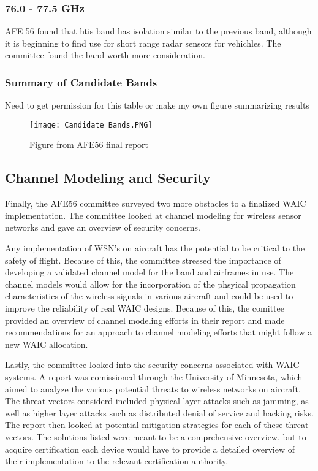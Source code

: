 \subsubsection{76.0 - 77.5 GHz}
 AFE 56 found that htis band has isolation similar to the previous band, although it is beginning to find use for short range radar sensors for vehichles. The committee found the band worth more consideration. 
 
\subsubsection{Summary of Candidate Bands}
 Need to get permission for this table or make my own figure summarizing results
 \begin{figure}
 \centering
 \texttt{[image: Candidate\_Bands.PNG]}
 \caption{Figure from AFE56 final report}
 \end{figure}
 
\subsection{Channel Modeling and Security}
Finally, the AFE56 committee surveyed two more obstacles to a finalized WAIC implementation. The committee looked at channel modeling for wireless sensor networks and  gave an overview of security concerns. 

Any implementation of WSN's on aircraft has the potential to be critical to the safety of flight. Because of this, the committee stressed the importance of  developing a validated channel model for the band and airframes in use. The channel models would allow for the incorporation of the phsyical propagation characteristics of the wireless signals in various aircraft and could be used to improve the reliability of real WAIC designs. Because of this, the comittee provided an overview of channel modeling efforts in their report and made recommendations for an approach to channel modeling efforts that might follow a new WAIC allocation. 

Lastly, the committee looked into the security concerns associated with WAIC systems. A report was comissioned through the University of Minnesota, which aimed to analyze the various potential threats to wireless networks on aircraft. The threat vectors considerd included physical layer attacks such as jamming, as well as higher layer attacks such as distributed denial of service and hacking risks. The report then looked at potential mitigation strategies for each of these threat vectors. The solutions listed were meant to be a comprehensive overview, but to acquire certification each device would have to provide a detailed overview of their implementation to the relevant certification authority. 

